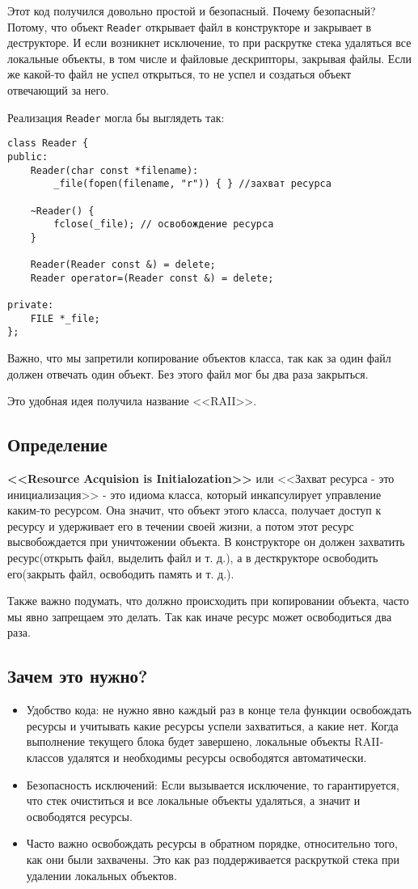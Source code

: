 Этот код получился довольно простой и безопасный. Почему безопасный? Потому, что объект \texttt{Reader} открывает файл в конструкторе и закрывает в деструкторе. И если возникнет исключение, то при раскрутке стека удаляться все локальные объекты, в том числе и файловые дескрипторы, закрывая файлы. Если же какой-то файл не успел открыться, то не успел и создаться объект отвечающий за него.

Реализация \texttt{Reader} могла бы выглядеть так:
\begin{verbatim}
class Reader {
public:
    Reader(char const *filename):
        _file(fopen(filename, "r")) { } //захват ресурса

    ~Reader() {
        fclose(_file); // освобождение ресурса
    }

    Reader(Reader const &) = delete;
    Reader operator=(Reader const &) = delete;

private:
    FILE *_file;
};
\end{verbatim}
Важно, что мы запретили копирование объектов класса, так как за один файл должен отвечать один объект. Без этого файл мог бы два раза закрыться.

Это удобная идея получила название <<RAII>>.

\subsection{Определение}

\textbf{<<Resource Acquision is Initialozation>>} или <<Захват ресурса - это инициализация>> - это идиома класса, который инкапсулирует управление каким-то ресурсом. Она значит, что объект этого класса, получает доступ к ресурсу и удерживает его в течении своей жизни, а потом этот ресурс высвобождается при уничтожении объекта.
В конструкторе он должен захватить ресурс(открыть файл, выделить файл и т. д.), а в десткрукторе освободить его(закрыть файл, освободить память и т. д.).

Также важно подумать, что должно происходить при копировании объекта, часто мы явно запрещаем это делать. Так как иначе ресурс может освободиться два раза.

\subsection{Зачем это нужно?}
\begin{itemize}
\item Удобство кода: не нужно явно каждый раз в конце тела функции освобождать ресурсы и учитывать какие ресурсы успели захватиться, а какие нет. Когда выполнение текущего блока будет завершено, локальные объекты RAII-классов удалятся и необходимы ресурсы освободятся автоматически.
\item Безопасность исключений: Если вызывается исключение, то гарантируется, что стек очиститься и все локальные объекты удаляться, а значит и освободятся ресурсы.
\item Часто важно освобождать ресурсы в обратном порядке, относительно того, как они были захвачены. Это как раз поддерживается раскруткой стека при удалении локальных объектов.
\end{itemize}

